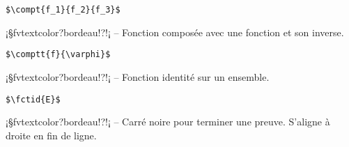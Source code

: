 \documentclass[11pt,a4paper,rgb]{report}
\begin{document}
\setlength{\leftskip}{.75cm}%
\setlength{\textwidth}{17.25cm}%

\colorbox{blue!15}{}
\hfill
\begin{minipage}{.65\textwidth}
	\begin{lstlisting}[linewidth=\textwidth, language={[LaTeX]TeX}]
	$\compt{f_1}{f_2}{f_3}$
	\end{lstlisting}
\end{minipage}

\setlength{\leftskip}{0pt}
\setlength{\textwidth}{18cm}%


\vspace*{.75cm}

\inCodeStub¡§fvtextcolor?bordeau!?!¡ -- Fonction composée avec une fonction et son inverse.

\setlength{\leftskip}{.75cm}%
\setlength{\textwidth}{17.25cm}%

\colorbox{blue!15}{}
\hfill
\begin{minipage}{.65\textwidth}
	\begin{lstlisting}[linewidth=\textwidth, language={[LaTeX]TeX}]
	$\comptt{f}{\varphi}$
	\end{lstlisting}
\end{minipage}

\setlength{\leftskip}{0pt}
\setlength{\textwidth}{18cm}%


\vspace*{.75cm}

\inCodeStub¡§fvtextcolor?bordeau!?!¡ -- Fonction identité sur un ensemble.

\setlength{\leftskip}{.75cm}%
\setlength{\textwidth}{17.25cm}%

\colorbox{blue!15}{}
\hfill
\begin{minipage}{.65\textwidth}
	\begin{lstlisting}[linewidth=\textwidth, language={[LaTeX]TeX}]
	$\fctid{E}$
	\end{lstlisting}
\end{minipage}

\setlength{\leftskip}{0pt}
\setlength{\textwidth}{18cm}%


\vspace*{.75cm}

\inCodeStub¡§fvtextcolor?bordeau!?\proved{}!¡ -- Carré noire pour terminer une preuve. S'aligne à droite en fin de ligne.
\end{document}
